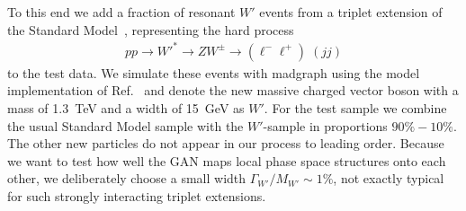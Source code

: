 To this end we add a fraction of resonant $W'$ events from a
triplet extension of the Standard Model~\cite{Biekoetter:2014jwa},
representing the hard process
%
\begin{align}
p p
\to {W'}^*
\to Z W^\pm
\to (\ell^- \ell^+) \; (j j )
\end{align}
%
to the test data.  We simulate these events with madgraph using the
model implementation of Ref.~\cite{Brehmer:2015rna} and denote the new
massive charged vector boson with a mass of 1.3~TeV and a width of
15~GeV as $W'$. For the test sample we combine the usual Standard
Model sample with the $W'$-sample in proportions $90\% - 10\%$.  The
other new particles do not appear in our process to leading order.
Because we want to test how well the GAN maps local phase space
structures onto each other, we deliberately choose a small width
$\Gamma_{W'}/M_{W'}\sim 1\%$, not exactly typical for such strongly
interacting triplet extensions.


